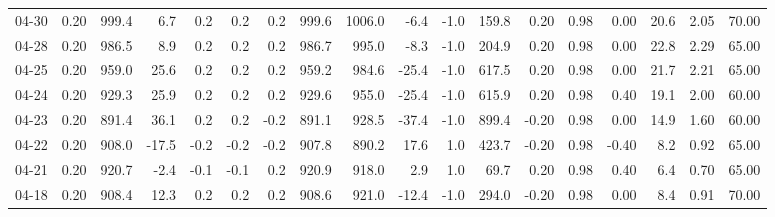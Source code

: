 \begin{threeparttable}
{\begin{tabular}{lrrrrrrrrrrrrrrrrr}
  04-30 &     0.20 &  999.4 &               6.7 &               0.2 &                0.2 &                0.2 &  999.6 & 1006.0 &       -6.4 &                     -1.0 &               159.8 &       0.20 &      0.98 &           0.00 &             20.6 &            2.05 &                  70.00 \\
  04-28 &     0.20 &  986.5 &               8.9 &               0.2 &                0.2 &                0.2 &  986.7 &  995.0 &       -8.3 &                     -1.0 &               204.9 &       0.20 &      0.98 &           0.00 &             22.8 &            2.29 &                  65.00 \\
  04-25 &     0.20 &  959.0 &              25.6 &               0.2 &                0.2 &                0.2 &  959.2 &  984.6 &      -25.4 &                     -1.0 &               617.5 &       0.20 &      0.98 &           0.00 &             21.7 &            2.21 &                  65.00 \\
  04-24 &     0.20 &  929.3 &              25.9 &               0.2 &                0.2 &                0.2 &  929.6 &  955.0 &      -25.4 &                     -1.0 &               615.9 &       0.20 &      0.98 &           0.40 &             19.1 &            2.00 &                  60.00 \\
  04-23 &     0.20 &  891.4 &              36.1 &               0.2 &                0.2 &               -0.2 &  891.1 &  928.5 &      -37.4 &                     -1.0 &               899.4 &      -0.20 &      0.98 &           0.00 &             14.9 &            1.60 &                  60.00 \\
  04-22 &     0.20 &  908.0 &             -17.5 &              -0.2 &               -0.2 &               -0.2 &  907.8 &  890.2 &       17.6 &                      1.0 &               423.7 &      -0.20 &      0.98 &          -0.40 &              8.2 &            0.92 &                  65.00 \\
  04-21 &     0.20 &  920.7 &              -2.4 &              -0.1 &               -0.1 &                0.2 &  920.9 &  918.0 &        2.9 &                      1.0 &                69.7 &       0.20 &      0.98 &           0.40 &              6.4 &            0.70 &                  65.00 \\
  04-18 &     0.20 &  908.4 &              12.3 &               0.2 &                0.2 &                0.2 &  908.6 &  921.0 &      -12.4 &                     -1.0 &               294.0 &      -0.20 &      0.98 &           0.00 &              8.4 &            0.91 &                  70.00 \\

\end{tabular}}
\end{threeparttable}
